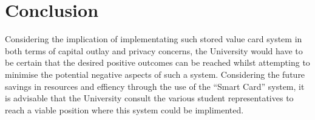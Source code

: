\section{Conclusion}

Considering the implication of implementating such stored value card system in both terms of capital outlay and privacy concerns, the University would have to be certain that the desired positive outcomes can be reached whilst attempting to minimise the potential negative aspects of such a system. Considering the future savings in resources and effiency through the use of the ``Smart Card'' system, it is advisable that the University consult the various student representatives to reach a viable position where this system could be implimented.
